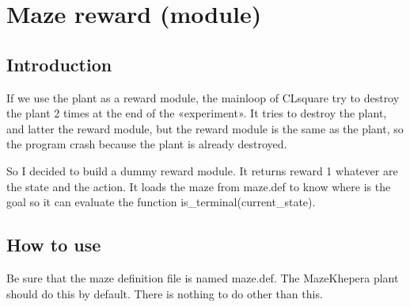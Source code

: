 \section{Maze reward (module)}

\subsection{Introduction}

If we use the plant as a reward module, the mainloop of CLsquare try to 
destroy 
the plant 2 times at the end of the «experiment». It tries to destroy 
the plant, and latter the reward module, but the reward module is the 
same as the plant, so the program crash because the plant is already 
destroyed. 

So I decided to build a dummy reward module. It returns reward 1 
whatever are the state and the action. It loads the maze from maze.def 
to know where is the goal so it can evaluate the function 
is\_terminal(current\_state).

\subsection{How to use}

Be sure that the maze definition file is named maze.def. The MazeKhepera
plant should do this by default. There is nothing to do other than this.
